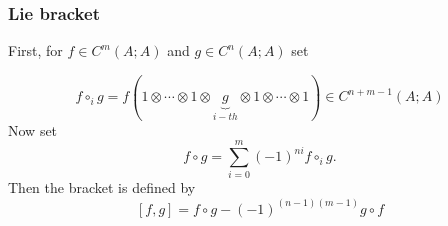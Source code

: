 \documentclass{beamer}
\theoremstyle{definition}
\newtheorem{teorema}{Theorem}
\newtheorem{defi}{Definition}
\begin{document}
%
%

\begin{frame}
\frametitle{Lie bracket}
First, for $f\in C^m(A;A)$ and $g\in C^n(A;A)$ set

$$
f\circ_i g=f(1\otimes\cdots \otimes 1\otimes \underbrace{g}_{i-th}\otimes 1\otimes \cdots\otimes 1)\in C^{n+m-1}(A;A)
$$
\pause 
Now set
\[
f\circ g=\sum_{i=0}^m (-1)^{ni}f\circ_i g.
\]\pause
Then the bracket is defined by $$[f,g]=f\circ g-(-1)^{(n-1)(m-1)}g\circ f$$
\end{frame}

%	
\end{document}
